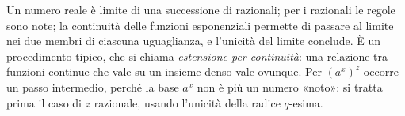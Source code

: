 \begin{schema}
\end{schema}

\begin{strategia}
Un numero reale è limite di una successione di razionali; per i razionali le regole sono
note; la continuità delle funzioni esponenziali permette di passare al limite nei due
membri di ciascuna uguaglianza, e l'unicità del limite conclude. È un procedimento tipico,
che si chiama \emph{estensione per continuità}: una relazione tra funzioni continue che
vale su un insieme denso vale ovunque. Per $(a^{x})^{z}$ occorre un passo intermedio,
perché la base $a^{x}$ non è più un numero «noto»: si tratta prima il caso di $z$
razionale, usando l'unicità della radice $q$-esima.
\end{strategia}


